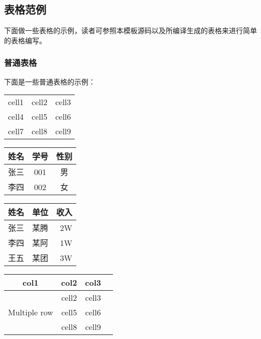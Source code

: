 \subsection{表格范例}

下面做一些表格的示例，读者可参照本模板源码以及所编译生成的表格来进行简单的表格编写。

\subsubsection{普通表格}

下面是一些普通表格的示例：

\begin{table}[htp]
  \centering
  \label{tab:1}
  \begin{tabular}{ c c c }
 cell1 & cell2 & cell3 \\ 
 cell4 & cell5 & cell6 \\  
 cell7 & cell8 & cell9    
\end{tabular}
\end{table}

\begin{table}[htp]
  \centering
  \label{tab:2}
  \begin{tabular}{ccc}
    \hline
    姓名& 学号& 性别\\
    \hline
    张三& 001& 男\\
    李四& 002& 女\\
    \hline
  \end{tabular}
\end{table}

\begin{table}[!htp]
  \centering
  \label{tab:3}
  \begin{tabular}{|l|c|r|}
    \hline
    姓名 & 单位 & 收入 \\
    \hline
    张三& 某腾 & 2W \\
    \hline
    李四& 某阿 & 1W \\
    \hline
    王五& 某团 & 3W \\
    \hline
  \end{tabular}
\end{table}

\begin{table}[!htp]
\centering
{}
\label{tab:4}
\begin{tabular}{ |c|c|c|c| } 
\hline
col1 & col2 & col3 \\
\hline
\multirow{3}{4em}{Multiple row} & cell2 & cell3 \\ 
& cell5 & cell6 \\ 
& cell8 & cell9 \\ 
\hline
\end{tabular}
\end{table}

